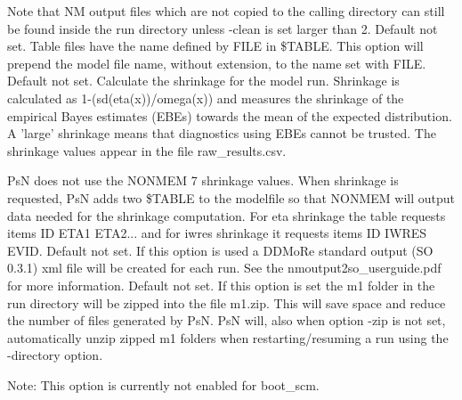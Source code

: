 \begin{optionlist}
Note that NM output files which are not copied to the calling directory can still be found inside the run directory unless -clean is set larger than 2.
\nextopt
{}
Default not set. Table files have the name defined by FILE in \$TABLE. This option will prepend the model file name, without extension, to the name set with FILE.
\nextopt
{}
Default not set. Calculate the shrinkage for the model run.  Shrinkage is calculated as 1-(sd(eta(x))/omega(x)) and measures the shrinkage of the empirical Bayes estimates (EBEs) towards the mean of the expected distribution.  A 'large' shrinkage means that diagnostics using EBEs cannot be trusted. The shrinkage values appear in the file raw\_results.csv. 

PsN does not use the NONMEM 7 shrinkage values. When shrinkage is requested, PsN adds two \$TABLE to the modelfile so that NONMEM will output data needed for the shrinkage computation. For eta shrinkage the table requests items ID ETA1 ETA2... and for iwres shrinkage it requests items ID IWRES EVID. 
\nextopt
{}
Default not set. If this option is used a DDMoRe standard output (SO 0.3.1) xml file will be created for each run. See the \mbox{nmoutput2so\_userguide.pdf} for more information.
\nextopt
{}
Default not set. If this option is set the m1 folder in the run directory will be zipped into the file m1.zip. This will save space and reduce the number of files generated by PsN. PsN will, also when option -zip is not set, automatically unzip zipped m1 folders when restarting/resuming a run using the -directory option.

Note: This option is currently not enabled for boot\_scm.
\nextopt
\end{optionlist}
